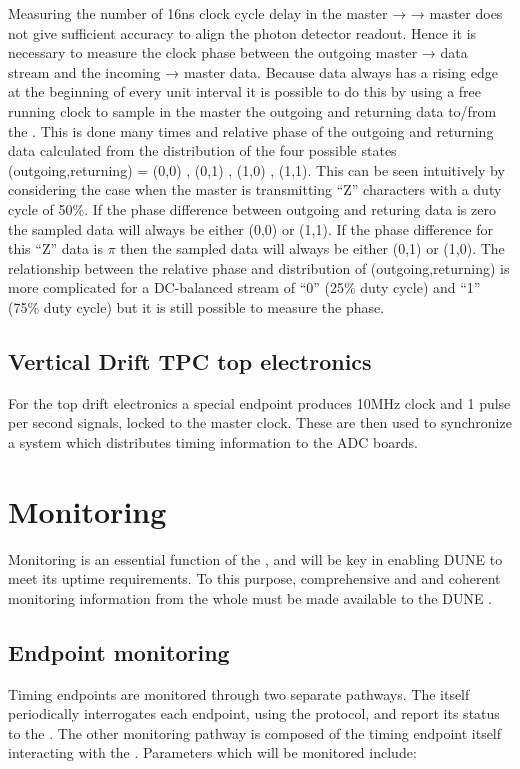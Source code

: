 \documentclass{dune}
\begin{document}
Measuring the number of 16ns clock cycle delay in the master →  → master does not give sufficient accuracy to align the photon detector readout. Hence it is necessary to measure the clock phase between the outgoing  master →  data stream and the incoming → master data. 
Because  data always has a rising edge at the beginning of every unit interval it is possible to do this by using a free running clock to sample in the master the outgoing and returning data to/from the . This is done many times and relative phase of the outgoing and returning data calculated from the distribution of the four possible states (outgoing,returning) = (0,0) , (0,1) , (1,0) , (1,1). This can be seen intuitively by considering the case when the master is transmitting ``Z'' characters with a duty cycle of 50\%. If the phase difference between outgoing and returing data is zero the sampled data will always be either (0,0) or (1,1). If the phase difference for this ``Z'' data is $\pi$ then the sampled data will always be either (0,1) or (1,0). The relationship between the relative phase and distribution of (outgoing,returning) is more complicated for a DC-balanced stream of ``0'' (25\% duty cycle) and ``1'' (75\% duty cycle) but it is still possible to measure the phase.

\subsection{Vertical Drift TPC top electronics}

For the  top drift electronics a special  endpoint produces 10MHz clock and 1 pulse per second signals, locked to the  master clock. These are then used to synchronize a  system\cite{wr_ohwr} which distributes timing information to the ADC boards.

\section{Monitoring}
Monitoring is an essential function of the , and will be key in enabling DUNE to meet its uptime requirements. To this purpose, comprehensive and and coherent monitoring information from the whole  must be made available to the DUNE .

\subsection{Endpoint monitoring}
Timing endpoints are monitored through two separate pathways. The  itself periodically interrogates each endpoint, using the  protocol, and report its status to the . The other monitoring pathway is composed of the timing endpoint itself interacting with the . Parameters which will be monitored include:
\end{document}
